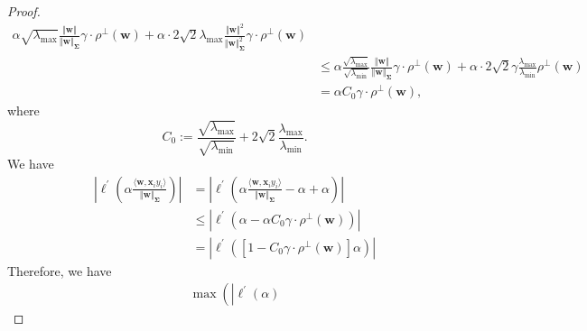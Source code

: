 \documentclass[pdflatex,sn-basic]{sn-jnl}%
\theoremstyle{thmstyleone}%
\begin{document}
\begin{appendices}
\begin{proof}
\begin{equation}
\begin{aligned}
    \alpha\sqrt{\lambda_{\max}} 
    \frac{
      \Vert \mathbf{w} \Vert
    }{\left\Vert \mathbf{w} \right\Vert_{\mathbf{\Sigma}}} \gamma \cdot \rho^{\perp} \left(\mathbf{w}\right)
    +
    \alpha \cdot 2 \sqrt{2} \lambda_{\max}
    \frac{\Vert \mathbf{w} \Vert^2}{
      \left\Vert \mathbf{w} \right\Vert_{\mathbf{\Sigma}}^2
    }
    \gamma 
    \cdot \rho^{\perp} \left(\mathbf{w}\right)
    \\ & \le 
    \alpha \frac{\sqrt{\lambda_{\max}} }{\sqrt{\lambda_{\min}} }
    \frac{
      \Vert \mathbf{w} \Vert
    }{\left\Vert \mathbf{w} \right\Vert_{\mathbf{\Sigma}}} \gamma \cdot \rho^{\perp} \left(\mathbf{w}\right)
    +
    \alpha \cdot 2 \sqrt{2} \gamma
    \frac{\lambda_{\max}}{\lambda_{\min}}
    \rho^{\perp} \left(\mathbf{w}\right)
    \\ & =
    \alpha
    C_0
    \gamma \cdot \rho^{\perp} \left(\mathbf{w}\right)
    ,
  \end{aligned}
  \end{equation}
  where
  \[
    C_0 :=
    \frac{\sqrt{\lambda_{\max}}}{\sqrt{\lambda_{\min}}}
    +
    2 \sqrt{2} \frac{\lambda_{\max}}{\lambda_{\min}}.
  \]
  We have 
  \begin{equation*}
  \begin{aligned}
    \left| 
      \ell^{\prime} \left(
        \alpha \frac{\langle \mathbf{w}, \mathbf{x}_i y_i \rangle}{
          \left\Vert \mathbf{w} \right\Vert_{\mathbf{\Sigma}}
        } 
      \right)
    \right|
    & = 
    \left| 
      \ell^{\prime} \left(
        \alpha \frac{\langle \mathbf{w}, \mathbf{x}_i y_i \rangle}{
          \left\Vert \mathbf{w} \right\Vert_{\mathbf{\Sigma}}
        } 
        - \alpha + \alpha
      \right)
    \right|
    \\ & \le 
    \left| 
      \ell^{\prime} \left(
        \alpha - 
        \alpha
        C_0
        \gamma \cdot \rho^{\perp} \left(\mathbf{w}\right)
      \right)
    \right|
    \\ & = 
    \left| 
      \ell^{\prime} \left(
        \left[
          1
          - 
        C_0 
        \gamma \cdot \rho^{\perp} \left(\mathbf{w}\right)
        \right]
        \alpha
      \right)
    \right|
  \end{aligned}
  \end{equation*}
  Therefore, we have 
  \begin{equation}\label{eq:logit_derivative_shift_bound}
  \begin{aligned}
    \max \left(
      \left| 
      \ell^{\prime} \left(
        \alpha
      \right)

\end{aligned}
\end{equation}
\end{proof}
\end{appendices}
\end{document}
